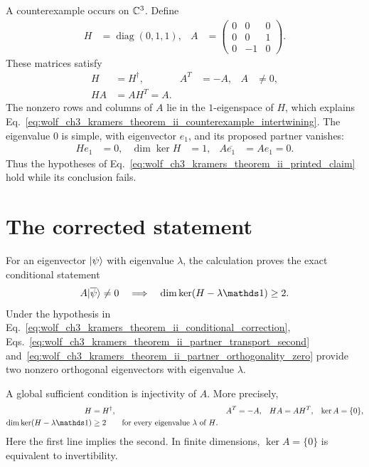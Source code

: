 \documentclass{article}
\begin{document}
A counterexample occurs on $\mathbb{C}^3$. Define
\begin{align}
    H&=\operatorname{diag}(0,1,1),
    &
    A&=
    \begin{pmatrix}
        0&0&0\\
        0&0&1\\
        0&-1&0
    \end{pmatrix}.
    \label{eq:wolf_ch3_kramers_theorem_ii_counterexample_matrices}
\end{align}
These matrices satisfy
\begin{align}
    H&=H^\dagger,
    &
    A^T&=-A,
    &
    A&\neq 0,
    \label{eq:wolf_ch3_kramers_theorem_ii_counterexample_basic_hypotheses}\\
    HA&=AH^T=A.
    \label{eq:wolf_ch3_kramers_theorem_ii_counterexample_intertwining}
\end{align}
The nonzero rows and columns of $A$ lie in the $1$-eigenspace of $H$, which
explains Eq.~\ref{eq:wolf_ch3_kramers_theorem_ii_counterexample_intertwining}.
The eigenvalue $0$ is simple, with eigenvector $e_1$, and its proposed partner
vanishes:
\begin{align}
    He_1&=0,
    &
    \dim\ker H&=1,
    &
    A\overline{e_1}&=Ae_1=0.
    \label{eq:wolf_ch3_kramers_theorem_ii_counterexample_simple_eigenvalue}
\end{align}
Thus the hypotheses of
Eq.~\ref{eq:wolf_ch3_kramers_theorem_ii_printed_claim} hold while its
conclusion fails.

\section{The corrected statement}

For an eigenvector $|\psi\rangle$ with eigenvalue $\lambda$, the calculation
proves the exact conditional statement
\begin{align}
    A\ket{\overline{\psi}}\neq 0
    \quad\Longrightarrow\quad
    \dim\ker(H-\lambda\Id)\geq 2.
    \label{eq:wolf_ch3_kramers_theorem_ii_conditional_correction}
\end{align}
Under the hypothesis in
Eq.~\ref{eq:wolf_ch3_kramers_theorem_ii_conditional_correction},
Eqs.~\ref{eq:wolf_ch3_kramers_theorem_ii_partner_transport_second}
and~\ref{eq:wolf_ch3_kramers_theorem_ii_partner_orthogonality_zero} provide
two nonzero orthogonal eigenvectors with eigenvalue $\lambda$.

A global sufficient condition is injectivity of $A$. More precisely,
\begin{align}
    H&=H^\dagger,
    &
    A^T&=-A,
    &
    HA&=AH^T,
    &
    \ker A&=\{0\},
    \label{eq:wolf_ch3_kramers_theorem_ii_invertible_hypotheses}\\
    \dim\ker(H-\lambda\Id)&\geq 2
    \qquad\text{for every eigenvalue $\lambda$ of $H$}.
    \label{eq:wolf_ch3_kramers_theorem_ii_invertible_conclusion}
\end{align}
Here the first line implies the second. In finite dimensions, $\ker A=\{0\}$
is equivalent to invertibility.
\end{document}
